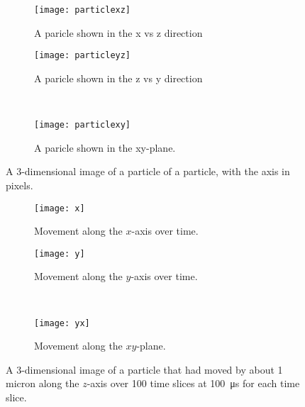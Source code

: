 \begin{figure}[ht!]
    \begin{center}

        \begin{subfigure}[t]{0.4\textwidth}
            \label{fig:particlexz}
            \texttt{[image: particlexz]}
            \caption{A paricle shown in the x vs z direction}
        \end{subfigure}
        \hspace*{\fill}
        \begin{subfigure}[t]{0.4\textwidth}
            \label{fig:particleyz}
            \texttt{[image: particleyz]}
            \caption{A paricle shown in the z vs y direction}
        \end{subfigure}
        \\
        \begin{subfigure}[t]{0.6\textwidth}
            \label{fig:particlexy}
            \texttt{[image: particlexy]}
            \caption{A paricle shown in the xy-plane.}
        \end{subfigure}


    \end{center}
    \caption{%
        A 3-dimensional image of a particle of a particle, with the axis in
        pixels.
    }%
    \label{fig:3Dparticle}
\end{figure}

\begin{figure}[ht!]
    \begin{center}

        \begin{subfigure}[t]{0.4\textwidth}
            \label{fig:3Dx}
            \texttt{[image: x]}
            \caption{Movement along the $x$-axis over time.}
        \end{subfigure}
        \hspace*{\fill}
        \begin{subfigure}[t]{0.4\textwidth}
            \label{fig:3Dy}
            \texttt{[image: y]}
            \caption{Movement along the $y$-axis over time.}
        \end{subfigure}
        \\
        \begin{subfigure}[t]{0.6\textwidth}
            \label{fig:3Dyx}
            \texttt{[image: yx]}
            \caption{Movement along the $xy$-plane.}
        \end{subfigure}


    \end{center}
    \caption{%
        A 3-dimensional image of a particle that had moved by about 1 micron
        along the $z$-axis over 100 time slices at \SI{100}{\micro\second} for
        each time slice.
    }%
    \label{fig:3D}
\end{figure}

